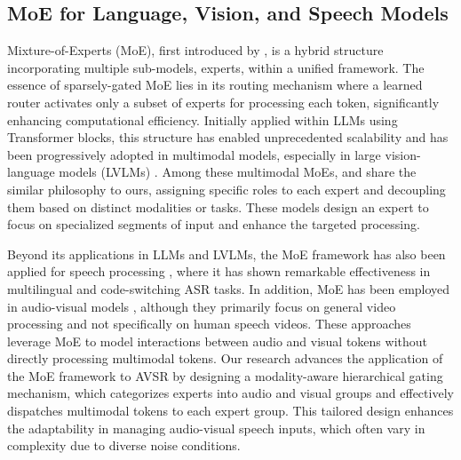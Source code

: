 \subsection{MoE for Language, Vision, and Speech Models}

Mixture-of-Experts (MoE), first introduced by \citet{jacobs1991adaptive}, is a hybrid structure incorporating multiple sub-models, \ie experts, within a unified framework. The essence of sparsely-gated MoE \cite{shazeer2017outrageously, lepikhin2021gshard, dai2022stablemoe} lies in its routing mechanism where a learned router activates only a subset of experts for processing each token, significantly enhancing computational efficiency. Initially applied within LLMs using Transformer blocks, this structure has enabled unprecedented scalability \cite{fedus2022switch, zoph2022st, jiang2024mixtral, guo2025deepseek} and has been progressively adopted in multimodal models, especially in large vision-language models (LVLMs) \cite{mustafa2022multimodal, lin2024moellava, mckinzie2025mm1}.
Among these multimodal MoEs, \citet{zhu2022uni, shen2023scaling, li2023pace, li2024uni} and \citet{lee2025moai} share the similar philosophy to ours, assigning specific roles to each expert and decoupling them based on distinct modalities or tasks. These models design an expert to focus on specialized segments of input and enhance the targeted processing.

Beyond its applications in LLMs and LVLMs, the MoE framework has also been applied for speech processing \cite{you2021speechmoe, you2022speechmoe2, hu2023mixture, wang2023language}, where it has shown remarkable effectiveness in multilingual and code-switching ASR tasks. In addition, MoE has been employed in audio-visual models \cite{cheng2024mixtures, wu2024robust}, although they primarily focus on general video processing and not specifically on human speech videos. These approaches leverage MoE to model interactions between audio and visual tokens without directly processing multimodal tokens.
Our research advances the application of the MoE framework to AVSR by designing a modality-aware hierarchical gating mechanism, which categorizes experts into audio and visual groups and effectively dispatches multimodal tokens to each expert group. 
This tailored design enhances the adaptability in managing audio-visual speech inputs, which often vary in complexity due to diverse noise conditions.
